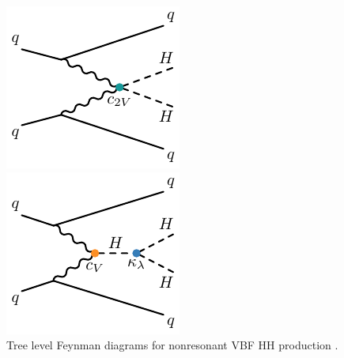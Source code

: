 \begin{figure}[!thp]
\begin{minipage}[c]{.31\textwidth}
        \includegraphics[width=\textwidth]{chapters/chapter1_theory/images/vbf_c2v.pdf}
    \end{minipage}
    \begin{minipage}[c]{.31\textwidth}
        \includegraphics[width=\textwidth]{chapters/chapter1_theory/images/vbf_klambda.pdf}
    \end{minipage}

    \caption{Tree level Feynman diagrams for nonresonant VBF HH production \cite{vbf_4b}.}
    \label{fig:vbf_feyn}
\end{figure}



